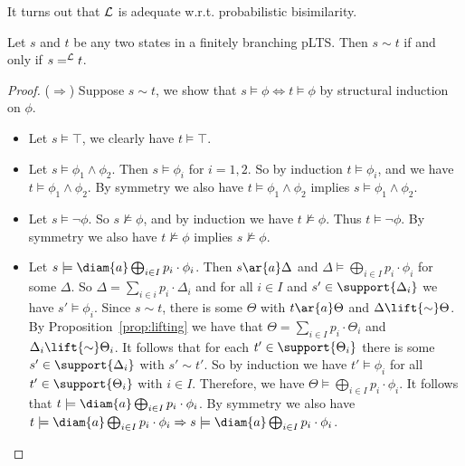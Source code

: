 \documentclass{article}
\def \BISI{\sim}
\def \CL{{\cal L}}
\begin{document}
It turns out that $\CL$ is adequate w.r.t. probabilistic
bisimilarity.
\begin{theorem}[Adequacy]\label{p:modal.characterisation}
Let $s$ and $t$ be any two states in a finitely branching pLTS. Then
$s\BISI t$ if and only if $s =^\CL t$.
\end{theorem}
\begin{proof}
($\Rightarrow$)
 Suppose $s\BISI t$, we show that $s\models\phi \Leftrightarrow
t\models\phi$ by structural induction on $\phi$.
\begin{itemize}
\item Let $s\models\top$, we clearly have $t\models\top$.
\item Let $s \models\phi_1\wedge\phi_2$. Then $s\models\phi_i$
  for $i=1,2$. So by induction $t\models\phi_i$, and we have
  $t\models \phi_1\wedge\phi_2$. By symmetry we also have
  $t\models \phi_1\wedge\phi_2$ implies $s\models
  \phi_1\wedge\phi_2$.
\item Let $s\models\neg\phi$. So $s\not\models\phi$, and by induction
  we have $t\not\models\phi$. Thus $t\models\neg\phi$. By symmetry we
  also have $t\not\models\phi$ implies $s\not\models\phi$.
\item Let $s\models\diam{a}\bigoplus_{i\in I}p_i\cdot\phi_i$. Then $s\ar{a}\Delta$ and $\Delta\models\bigoplus_{i\in I}p_i\cdot\phi_i$
  for some $\Delta$. So
  $\Delta=\sum_{i\in i}p_i\cdot\Delta_i$ and for all $i\in I$ and
  $s'\in\support{\Delta_i}$ we have $s'\models\phi_i$. Since $s\BISI t$, there is some $\Theta$ with $t\ar{a}\Theta$
  and $\Delta\lift{\BISI} \Theta$. By
  Proposition~\ref{prop:lifting}  we have that $\Theta=\sum_{i\in
  I}p_i\cdot\Theta_i$ and $\Delta_i\lift{\BISI}\Theta_i$. It follows
  that for each $t'\in\support{\Theta_i}$ there is some
  $s'\in\support{\Delta_i}$ with $s'\BISI t'$.
  So by induction we have $t'\models\phi_i$ for all $t'\in\support{\Theta_i}$ with $i\in I$.
  Therefore, we have $\Theta\models\bigoplus_{i\in
  I}p_i\cdot\phi_i$. It follows that $t\models\diam{a}\bigoplus_{i\in
  I}p_i\cdot\phi_i$.
  By symmetry we also have
  $t\models\diam{a}\bigoplus_{i\in I}p_i\cdot\phi_i\Rightarrow s\models\diam{a}\bigoplus_{i\in I}p_i\cdot\phi_i$.
\end{itemize}


\end{proof}
\end{document}
